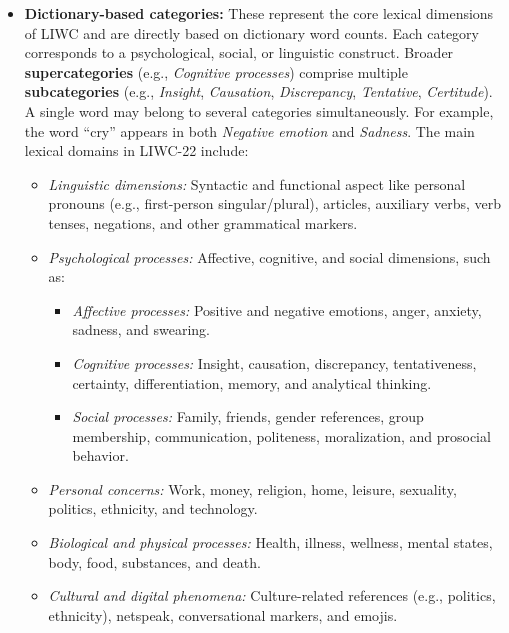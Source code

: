 \begin{itemize}
    \item \textbf{Dictionary-based categories:} These represent the core lexical dimensions of LIWC and are directly based on dictionary word counts. Each category corresponds to a psychological, social, or linguistic construct. Broader \textbf{supercategories} (e.g., \textit{Cognitive processes}) comprise multiple \textbf{subcategories} (e.g., \textit{Insight}, \textit{Causation}, \textit{Discrepancy}, \textit{Tentative}, \textit{Certitude}). A single word may belong to several categories simultaneously. For example, the word “cry” appears in both \textit{Negative emotion} and \textit{Sadness}. The main lexical domains in LIWC-22 include:
        \begin{itemize}
            \item \textit{Linguistic dimensions:} Syntactic and functional aspect like personal pronouns (e.g., first-person singular/plural), articles, auxiliary verbs, verb tenses, negations, and other grammatical markers.
            \item \textit{Psychological processes:} Affective, cognitive, and social dimensions, such as:
                \begin{itemize}
                    \item \textit{Affective processes:} Positive and negative emotions, anger, anxiety, sadness, and swearing.
                    \item \textit{Cognitive processes:} Insight, causation, discrepancy, tentativeness, certainty, differentiation, memory, and analytical thinking.
                    \item \textit{Social processes:} Family, friends, gender references, group membership, communication, politeness, moralization, and prosocial behavior.
                \end{itemize}
            \item \textit{Personal concerns:} Work, money, religion, home, leisure, sexuality, politics, ethnicity, and technology.
            \item \textit{Biological and physical processes:} Health, illness, wellness, mental states, body, food, substances, and death.
            \item \textit{Cultural and digital phenomena:} Culture-related references (e.g., politics, ethnicity), netspeak, conversational markers, and emojis.
        \end{itemize}


\end{itemize}
